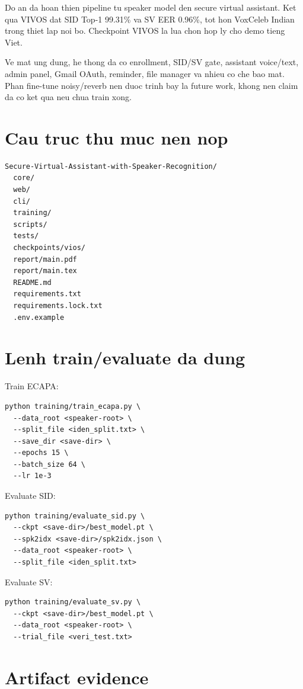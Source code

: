 \documentclass[12pt,a4paper]{article}
\begin{document}
Do an da hoan thien pipeline tu speaker model den secure virtual assistant. Ket
qua VIVOS dat SID Top-1 99.31\% va SV EER 0.96\%, tot hon VoxCeleb Indian trong
thiet lap noi bo. Checkpoint VIVOS la lua chon hop ly cho demo tieng Viet.

Ve mat ung dung, he thong da co enrollment, SID/SV gate, assistant voice/text,
admin panel, Gmail OAuth, reminder, file manager va nhieu co che bao mat. Phan
fine-tune noisy/reverb nen duoc trinh bay la future work, khong nen claim da co
ket qua neu chua train xong.

\appendix
\section{Cau truc thu muc nen nop}

\begin{lstlisting}
Secure-Virtual-Assistant-with-Speaker-Recognition/
  core/
  web/
  cli/
  training/
  scripts/
  tests/
  checkpoints/vios/
  report/main.pdf
  report/main.tex
  README.md
  requirements.txt
  requirements.lock.txt
  .env.example
\end{lstlisting}

\section{Lenh train/evaluate da dung}

Train ECAPA:

\begin{lstlisting}
python training/train_ecapa.py \
  --data_root <speaker-root> \
  --split_file <iden_split.txt> \
  --save_dir <save-dir> \
  --epochs 15 \
  --batch_size 64 \
  --lr 1e-3
\end{lstlisting}

Evaluate SID:

\begin{lstlisting}
python training/evaluate_sid.py \
  --ckpt <save-dir>/best_model.pt \
  --spk2idx <save-dir>/spk2idx.json \
  --data_root <speaker-root> \
  --split_file <iden_split.txt>
\end{lstlisting}

Evaluate SV:

\begin{lstlisting}
python training/evaluate_sv.py \
  --ckpt <save-dir>/best_model.pt \
  --data_root <speaker-root> \
  --trial_file <veri_test.txt>
\end{lstlisting}

\section{Artifact evidence}
\end{document}
